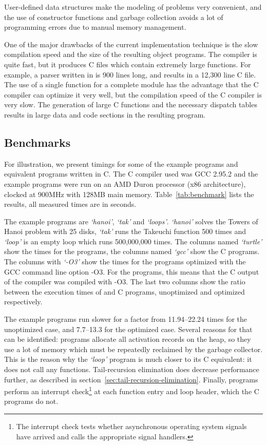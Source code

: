User-defined data structures make the modeling of problems very
convenient, and the use of constructor functions and garbage
collection avoids a lot of programming errors due to manual memory
management.

One of the major drawbacks of the current implementation technique is
the slow compilation speed and the size of the resulting object
programs.  The \turtle{} compiler is quite fast, but it produces C
files which contain extremely large functions.  For example, a
\turtle{} parser written in \turtle{} is 900 lines long, and results
in a 12,300 line C file.  The use of a single function for a complete
\turtle{} module has the advantage that the C compiler can optimize it
very well, but the compilation speed of the C compiler is very slow.
The generation of large C functions and the necessary dispatch tables
results in large data and code sections in the resulting program.

\subsection{Benchmarks}

For illustration, we present timings for some of the \turtle{} example
programs and equivalent programs written in C.  The C compiler used
was GCC 2.95.2 and the example programs were run on an AMD Duron
processor (x86 architecture), clocked at 900MHz with 128MB main
memory.  Table~\ref{tab:benchmark} lists the results, all measured
times are in seconds.

The example programs are {\em `hanoi'}, {\em `tak'} and {\em `loops'}.
{\em `hanoi'} solves the Towers of Hanoi problem with 25 disks, {\em
  `tak'} runs the Takeuchi function 500 times and {\em `loop'} is an
empty loop which runs 500,000,000 times.  The columns named {\em
  `turtle'} show the times for the \turtle{} programs, the columns named
{\em `gcc'} show the C programs.  The columns with {\em `-O3'} show the
times for the programs optimized with the GCC command line option -O3.
For the \turtle{} programs, this means that the C output of the
compiler was compiled with -O3.  The last two columns show the ratio
between the execution times of \turtle{} and C programs, unoptimized
and optimized respectively.

The example programs run slower for a factor from 11.94--22.24 times
for the unoptimized case, and 7.7--13.3 for the optimized case.
Several reasons for that can be identified: \turtle{} programs
allocate all activation records on the heap, so they use a lot of
memory which must be repeatedly reclaimed by the garbage collector.
This is the reason why the {\em `loop'} program is much closer to its
C equivalent: it does not call any functions.  Tail-recursion
elimination does decrease performance further, as described in
section~\ref{sec:tail-recursion-elimination}.  Finally, \turtle{}
programs perform an interrupt check\footnote{The interrupt check tests
  whether asynchronous operating system signals have arrived and calls
  the appropriate signal handlers.} at each function entry and loop
header, which the C programs do not.

